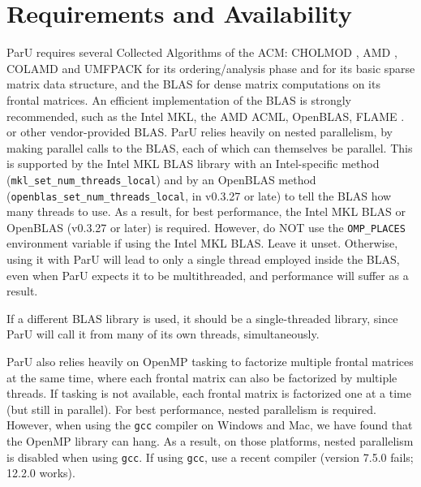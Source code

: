 \documentclass[12pt]{article}
\begin{document}
\section{Requirements and Availability}
\label{summary}

ParU requires several Collected Algorithms of the ACM: CHOLMOD
\cite{ChenDavisHagerRajamanickam09,DavisHager09}, AMD
\cite{AmestoyDavisDuff96,AmestoyDavisDuff03}, COLAMD
\cite{DavisGilbertLarimoreNg00_algo,DavisGilbertLarimoreNg00} and UMFPACK
\cite{10.1145/992200.992206} for its ordering/analysis phase and for its basic
sparse matrix data structure, and the BLAS \cite{dddh:90} for dense matrix
computations on its frontal matrices.  An efficient implementation of the BLAS
is strongly recommended, such as the Intel MKL, the AMD ACML, OpenBLAS, FLAME
\cite{GotoVanDeGeijn08}. or other vendor-provided BLAS.  ParU relies heavily on
nested parallelism, by making parallel calls to the BLAS, each of which can
themselves be parallel.  This is supported by the Intel MKL BLAS library with
an Intel-specific method (\verb'mkl_set_num_threads_local') and by an OpenBLAS
method (\verb'openblas_set_num_threads_local', in v0.3.27 or late) to tell the
BLAS how many threads to use.  As a result, for best performance, the Intel MKL
BLAS or OpenBLAS (v0.3.27 or later) is required.  However, do NOT use the
\verb'OMP_PLACES' environment variable if using the Intel MKL BLAS.  Leave it
unset.  Otherwise, using it with ParU will lead to only a single thread
employed inside the BLAS, even when ParU expects it to be multithreaded,
and performance will suffer as a result.

If a different BLAS library is used, it should be a single-threaded library,
since ParU will call it from many of its own threads, simultaneously.

ParU also relies heavily on OpenMP tasking to factorize multiple frontal
matrices at the same time, where each frontal matrix can also be factorized by
multiple threads.  If tasking is not available, each frontal matrix is
factorized one at a time (but still in parallel).  For best performance, nested
parallelism is required.  However, when using the \verb'gcc' compiler on
Windows and Mac, we have found that the OpenMP library can hang.  As a result,
on those platforms, nested parallelism is disabled when using \verb'gcc'.
If using \verb'gcc', use a recent compiler (version 7.5.0 fails; 12.2.0
works).
\end{document}
